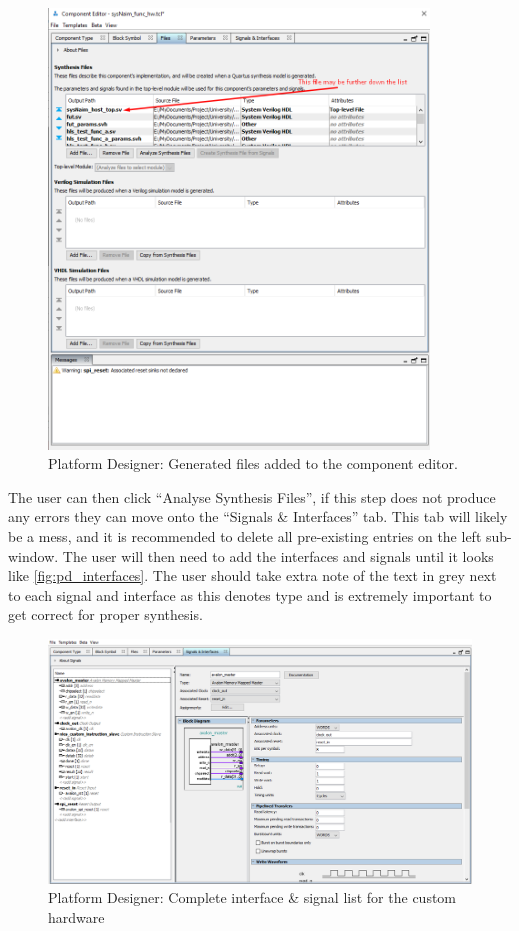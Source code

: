 \begin{figure}[!htb]
    \centering
    \includegraphics[width=0.9\textwidth]{05_evaluation/images/pd_sys_files.png}
    \caption{Platform Designer: Generated files added to the component editor.}
    \label{fig:pd_files}
\end{figure}

The user can then click “Analyse Synthesis Files”, if this step does not produce any errors they can move onto the “Signals \& Interfaces” tab. This tab will likely be a mess, and it is recommended to delete all pre-existing entries on the left sub-window. The user will then need to add the interfaces and signals until it looks like \autoref{fig:pd_interfaces}. The user should take extra note of the text in grey next to each signal and interface as this denotes type and is extremely important to get correct for proper synthesis.

\begin{figure}[!htb]
    \centering
    \includegraphics[width=1\textwidth]{05_evaluation/images/pd_interfaces.png}
    \caption{Platform Designer: Complete interface \& signal list for the custom hardware}
    \label{fig:pd_interfaces}
\end{figure}


